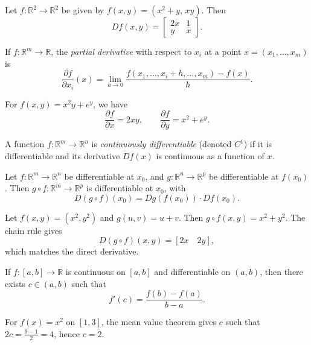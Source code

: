 \begin{example}
Let $f:\mathbb{R}^2\to \mathbb{R}^2$ be given by $f(x,y)=(x^2+y,\, xy)$.  
Then 
\[
Df(x,y) = \begin{bmatrix}
2x & 1\\
y & x
\end{bmatrix}.
\]
\end{example}

\begin{definition}
If $f:\mathbb{R}^m\to \mathbb{R}$, the \emph{partial derivative} with respect to $x_i$ at a point $x=(x_1,\dots,x_m)$ is
\[
\frac{\partial f}{\partial x_i}(x) = \lim_{h\to 0} \frac{f(x_1,\dots,x_i+h,\dots,x_m)-f(x)}{h}.
\]
\end{definition}

\begin{example}
For $f(x,y)=x^2y+e^y$, we have
\[
\frac{\partial f}{\partial x} = 2xy, \qquad \frac{\partial f}{\partial y} = x^2+e^y.
\]
\end{example}

\begin{definition}
A function $f:\mathbb{R}^m\to \mathbb{R}^n$ is \emph{continuously differentiable} (denoted $C^1$) if it is differentiable and its derivative $Df(x)$ is continuous as a function of $x$.
\end{definition}

\begin{proposition}
Let $f:\mathbb{R}^m\to \mathbb{R}^n$ be differentiable at $x_0$, and $g:\mathbb{R}^n\to \mathbb{R}^p$ be differentiable at $f(x_0)$.  
Then $g\circ f:\mathbb{R}^m\to \mathbb{R}^p$ is differentiable at $x_0$, with
\[
D(g\circ f)(x_0) = Dg(f(x_0)) \cdot Df(x_0).
\]
\end{proposition}

\begin{example}
Let $f(x,y)=(x^2,y^2)$ and $g(u,v)=u+v$. Then $g\circ f(x,y)=x^2+y^2$.  
The chain rule gives
\[
D(g\circ f)(x,y)= [2x \quad 2y],
\]
which matches the direct derivative.
\end{example}

\begin{theorem}
If $f:[a,b]\to \mathbb{R}$ is continuous on $[a,b]$ and differentiable on $(a,b)$, then there exists $c\in (a,b)$ such that
\[
f'(c) = \frac{f(b)-f(a)}{b-a}.
\]
\end{theorem}

\begin{example}
For $f(x)=x^2$ on $[1,3]$, the mean value theorem gives $c$ such that $2c=\frac{9-1}{2}=4$, hence $c=2$.
\end{example}

